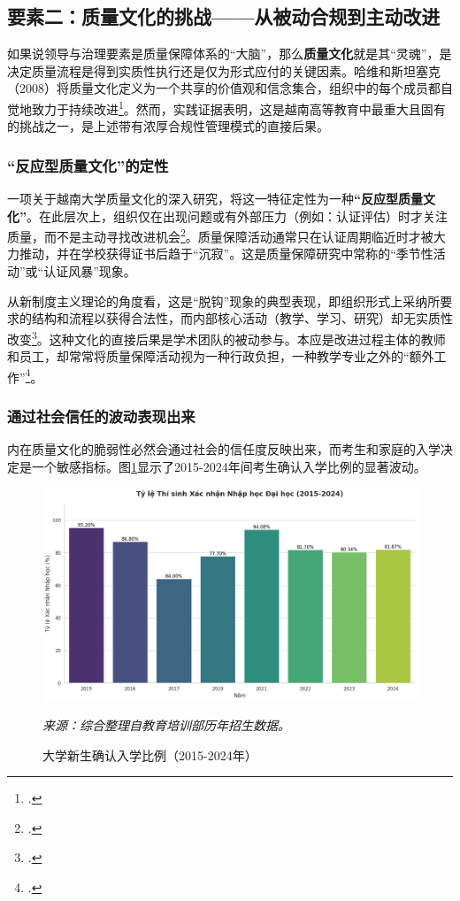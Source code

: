 \subsection{要素二：质量文化的挑战——从被动合规到主动改进}
\label{subsec:thach_thuc_vanhoa}

如果说领导与治理要素是质量保障体系的“大脑”，那么\textbf{质量文化}就是其“灵魂”，是决定质量流程是得到实质性执行还是仅为形式应付的关键因素。哈维和斯坦塞克（2008）将质量文化定义为一个共享的价值观和信念集合，组织中的每个成员都自觉地致力于持续改进\footcite{HarveyStensaker2008}。然而，实践证据表明，这是越南高等教育中最重大且固有的挑战之一，是上述带有浓厚合规性管理模式的直接后果。

\subsubsection{“反应型质量文化”的定性}
一项关于越南大学质量文化的深入研究，将这一特征定性为一种\textbf{“反应型质量文化”}。在此层次上，组织仅在出现问题或有外部压力（例如：认证评估）时才关注质量，而不是主动寻找改进机会\footcite{vjol_reactiveculture_2021}。质量保障活动通常只在认证周期临近时才被大力推动，并在学校获得证书后趋于“沉寂”。这是质量保障研究中常称的“季节性活动”或“认证风暴”现象。

从新制度主义理论的角度看，这是“脱钩”现象的典型表现，即组织形式上采纳所要求的结构和流程以获得合法性，而内部核心活动（教学、学习、研究）却无实质性改变\footcite{MeyerRowan1977}。这种文化的直接后果是学术团队的被动参与。本应是改进过程主体的教师和员工，却常常将质量保障活动视为一种行政负担，一种教学专业之外的“额外工作”\footcite{iosr_passiveparticipation_2021}。

\subsubsection{通过社会信任的波动表现出来}
内在质量文化的脆弱性必然会通过社会的信任度反映出来，而考生和家庭的入学决定是一个敏感指标。图\ref{fig:ty_le_nhap_hoc}显示了2015-2024年间考生确认入学比例的显著波动。

\begin{figure}[h!]
    \centering
    \includegraphics[width=\textwidth]{image/ty_le_nhap_hoc_2015-2024.png}
    \caption{大学新生确认入学比例（2015-2024年）}
    \label{fig:ty_le_nhap_hoc}
    \vspace{0.2cm}
    \footnotesize{\textit{来源：综合整理自教育培训部历年招生数据。}}
\end{figure}

